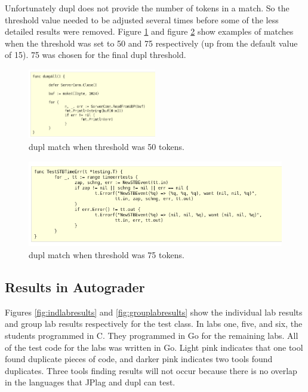 \documentclass[10pt,journal,compsoc]{IEEEtran}
\begin{document}
		Unfortunately dupl does not provide the number of tokens in a match. So the threshold value needed to be adjusted several times before some of the less detailed results were removed. Figure \ref{fig:dupl50} and figure \ref{fig:dupl75} show examples of matches when the threshold was set to 50 and 75 respectively (up from the default value of 15). 75 was chosen for the final dupl threshold.
		
		\begin{figure}[h!]
			\includegraphics[width=0.5\textwidth]{dupl50.png}
			\caption{dupl match when threshold was 50 tokens.}
			\label{fig:dupl50}
		\end{figure}
		
		\begin{figure}[h!]
			\includegraphics[width=1.0\textwidth]{dupl75.png}
			\caption{dupl match when threshold was 75 tokens.}
			\label{fig:dupl75}
		\end{figure}
		
		\subsection{Results in Autograder}
		
		Figures \ref{fig:indlabresults} and \ref{fig:grouplabresults} show the individual lab results and group lab results respectively for the test class. In labs one, five, and six, the students programmed in C. They programmed in Go for the remaining labs. All of the test code for the labs was written in Go.  Light pink indicates that one tool found duplicate pieces of code, and darker pink indicates two tools found duplicates. Three tools finding results will not occur because there is no overlap in the languages that JPlag and dupl can test.
		
\end{document}
